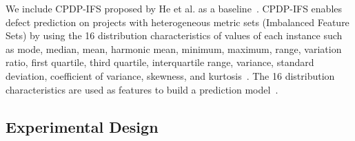 We include CPDP-IFS proposed by He et al. as a
baseline~\cite{He14}. CPDP-IFS enables defect prediction on
projects with heterogeneous metric sets (Imbalanced Feature Sets) by using the
16 distribution characteristics of values of each instance such as mode, median,
mean, harmonic mean, minimum, maximum, range, variation ratio, first quartile,
third quartile, interquartile range, variance, standard
deviation, coefficient of variance, skewness, and kurtosis~\cite{He14}.
The 16 distribution characteristics are used as features to build a prediction model~\cite{He14}.








\subsection{Experimental Design}
\label{sec:expdesign}

